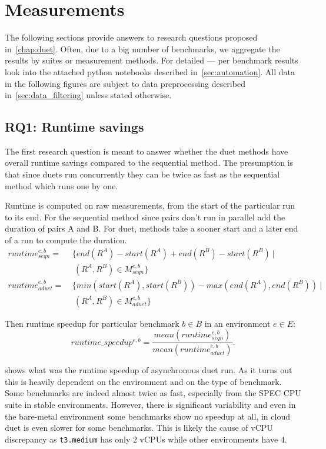 \section{Measurements}
\label{sec:measurements}

The following sections provide answers to research questions proposed in~\cref{chap:duet}.
Often, due to a big number of benchmarks, we aggregate the results by suites or measurement methods.
For detailed --- per benchmark results look into the attached python notebooks described in~\cref{sec:automation}.
All data in the following figures are subject to data preprocessing described in~\cref{sec:data_filtering} unless stated otherwise.

\subsection{RQ1: Runtime savings}
\label{sec:rq1}

The first research question is meant to answer whether the duet methods have overall runtime savings compared to the sequential method.
The presumption is that since duets run concurrently they can be twice as fast as the sequential method which runs one by one.

Runtime is computed on raw measurements, from the start of the particular run to its end. For the sequential method since pairs don't run in parallel add the duration of pairs A and B.
For duet, methods take a sooner start and a later end of a run to compute the duration.
\begin{align*}
runtime^{e, b}_{seqn}  =&~\{end(R^A) - start(R^A) + end(R^B) - start(R^B)~|\\
                        &~~(R^A, R^B) \in M^{e, b}_{seqn}\} \\
runtime^{e, b}_{aduet} =&~\{min(start(R^A), start(R^B)) - max(end(R^A), end(R^B))~|\\
                        &~~(R^A, R^B) \in M^{e, b}_{aduet}\}
\end{align*}

Then runtime speedup for particular benchmark $b \in B$ in an environment $e \in E$:
\begin{equation}\label{eq:runtimespeedup}
runtime\_speedup^{e, b} = \frac{mean(runtime^{e, b}_{seqn})}{mean(runtime^{e, b}_{aduet})}.
\end{equation}

 shows what was the runtime speedup of asynchronous duet run.
As it turns out this is heavily dependent on the environment and on the type of benchmark.
Some benchmarks are indeed almost twice as fast, especially from the SPEC CPU suite in stable environments.
However, there is significant variability and even in the \mbox{bare-metal} environment some benchmarks show no speedup at all, in cloud duet is even slower for some benchmarks.
This is likely the cause of vCPU discrepancy as \lstinline{t3.medium} has only $2$ vCPUs while other environments have $4$.

